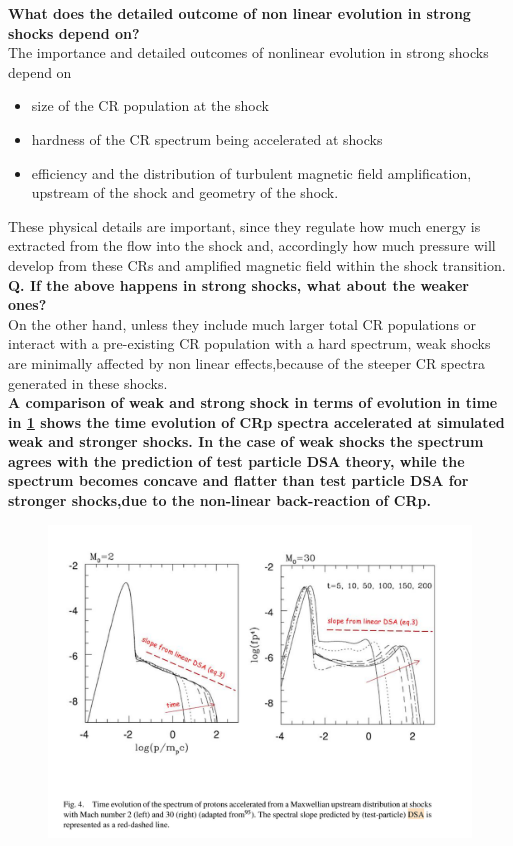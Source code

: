 \documentclass[11pt]{report}
\newcommand{\tbf}[1]{\textbf{#1}}
\begin{document}
\tbf{What does the detailed outcome of non linear evolution in strong shocks depend on?}\\

The importance and detailed outcomes of nonlinear evolution in strong shocks depend on
\begin{itemize}
\item size of the CR population at the shock
\item hardness of the CR spectrum being accelerated at shocks 
\item efficiency and the distribution of turbulent magnetic field amplification, upstream of the shock and geometry of the shock.
\end{itemize}
These physical details are important, since they regulate how much energy is extracted from the flow into the shock and, accordingly how much pressure will develop from these CRs and amplified magnetic field within the shock transition.\\


\tbf{Q. If the above happens in strong shocks, what about the weaker ones?}\\
 On the other hand, unless they include much larger total CR populations or interact with a pre-existing CR population with a hard spectrum, weak shocks are minimally affected by non linear effects,because of the steeper CR spectra generated in these shocks.\\
 
\tbf{A comparison of weak and strong shock in terms of evolution in time in \ref{fig:dsacomparison} shows the time evolution of CRp spectra accelerated at simulated weak and stronger shocks. In the case of weak shocks the spectrum agrees with the prediction of test particle DSA theory, while the spectrum becomes concave and flatter than test particle DSA for stronger shocks,due to the non-linear back-reaction of CRp.}\\

\begin{figure}[h!]\label{fig:dsacomparison}
\includegraphics[scale=1]{DSA.png}
\end{figure}
 
\end{document}
